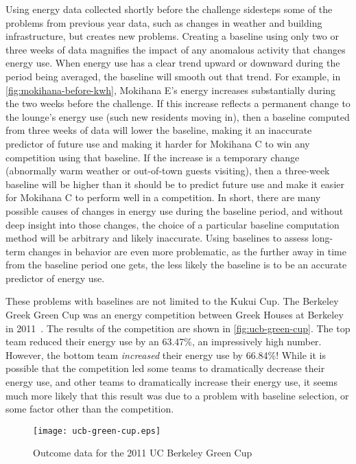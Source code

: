 Using energy data collected shortly before the challenge sidesteps some of the problems from previous year data, such as changes in weather and building infrastructure, but creates new problems. Creating a baseline using only two or three weeks of data magnifies the impact of any anomalous activity that changes energy use. When energy use has a clear trend upward or downward during the period being averaged, the baseline will smooth out that trend. For example, in \autoref{fig:mokihana-before-kwh}, Mokihana E's energy increases substantially during the two weeks before the challenge. If this increase reflects a permanent change to the lounge's energy use (such new residents moving in), then a baseline computed from three weeks of data will lower the baseline, making it an inaccurate predictor of future use and making it harder for Mokihana C to win any competition using that baseline. If the increase is a temporary change (abnormally warm weather or out-of-town guests visiting), then a three-week baseline will be higher than it should be to predict future use and make it easier for Mokihana C to perform well in a competition. In short, there are many possible causes of changes in energy use during the baseline period, and without deep insight into those changes, the choice of a particular baseline computation method will be arbitrary and likely inaccurate. Using baselines to assess long-term changes in behavior are even more problematic, as the further away in time from the baseline period one gets, the less likely the baseline is to be an accurate predictor of energy use.

These problems with baselines are not limited to the Kukui Cup. The Berkeley Greek Green Cup was an energy competition between Greek Houses at Berkeley in 2011~\cite{Dhong2011}. The results of the competition are shown in \autoref{fig:ucb-green-cup}. The top team reduced their energy use by an 63.47\%, an impressively high number. However, the bottom team \emph{increased} their energy use by 66.84\%! While it is possible that the competition led some teams to dramatically decrease their energy use, and other teams to dramatically increase their energy use, it seems much more likely that this result was due to a problem with baseline selection, or some factor other than the competition.

\begin{figure}[htbp]
	\centering
	\texttt{[image: ucb-green-cup.eps]}
	\caption{Outcome data for the 2011 UC Berkeley Green Cup}
	\label{fig:ucb-green-cup}
\end{figure}

